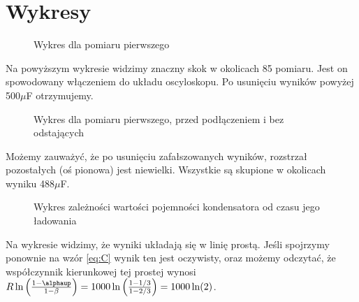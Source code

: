 \documentclass[12pt]{mwrep}
\let\alpha\alphaup
\begin{document}
	\section{Wykresy} %
	\begin{figure}[H]\caption{Wykres dla pomiaru pierwszego}\label{fig:pom1_farad}
	\end{figure}
	Na powyższym wykresie widzimy znaczny skok w okolicach 85 pomiaru. Jest on spowodowany włączeniem do układu oscyloskopu. Po usunięciu wyników powyżej 500$\mu$F otrzymujemy.
	\begin{figure}[H]\caption{Wykres dla pomiaru pierwszego, przed podłączeniem i bez odstających}\label{fig:pom1_less}
	\end{figure}
	Możemy zauważyć, że po usunięciu zafałszowanych wyników, rozstrzał pozostałych (oś pionowa) jest niewielki. Wszystkie są skupione w okolicach wyniku 488$\mu$F.\\
	\begin{figure}[H]\caption{Wykres zależności wartości pojemności kondensatora od czasu jego ładowania}\label{fig:pom1_farad_tim_less}
	\end{figure}
	Na wykresie widzimy, że wyniki układają się w linię prostą. Jeśli spojrzymy ponownie na wzór \eqref{eq:C} wynik ten jest oczywisty, oraz możemy odczytać, że współczynnik kierunkowej tej prostej wynosi $R\ln\left(\frac{1-\alpha}{1-\beta}\right)=1000\ln\left(\frac{1-1/3}{1-2/3}\right)=1000\ln(2)$.\newline
	
\end{document}
